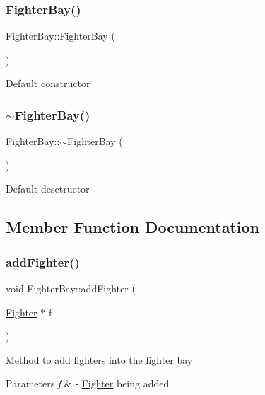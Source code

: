\subsubsection{\texorpdfstring{Fighter\+Bay()}{FighterBay()}}
{\footnotesize\ttfamily Fighter\+Bay\+::\+Fighter\+Bay (\begin{DoxyParamCaption}{ }\end{DoxyParamCaption})\hspace{0.3cm}{\ttfamily [inline]}}

Default constructor \mbox{\label{classFighterBay_aa037d013b598d478aa4314c16081cfc1}} 
\subsubsection{\texorpdfstring{$\sim$\+Fighter\+Bay()}{~FighterBay()}}
{\footnotesize\ttfamily Fighter\+Bay\+::$\sim$\+Fighter\+Bay (\begin{DoxyParamCaption}{ }\end{DoxyParamCaption})\hspace{0.3cm}{\ttfamily [inline]}}

Default desctructor 

\subsection{Member Function Documentation}
\mbox{\label{classFighterBay_a24764deae3987f30be8825c7673b90a0}} 
\subsubsection{\texorpdfstring{add\+Fighter()}{addFighter()}}
{\footnotesize\ttfamily void Fighter\+Bay\+::add\+Fighter (\begin{DoxyParamCaption}\item[{\hyperlink{classFighter}{Fighter} $\ast$}]{f }\end{DoxyParamCaption})}

Method to add fighters into the fighter bay 
\begin{DoxyParams}{Parameters}
{\em f} & -\/ \hyperlink{classFighter}{Fighter} being added \\
\hline
\end{DoxyParams}
\mbox{\label{classFighterBay_ab504d923d2e3837c29c56453bd1f7ba1}} 

